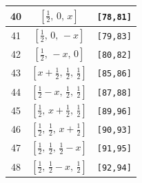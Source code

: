 \documentclass[fleqn,8pt]{jsarticle}
\begin{document}
\begin{longtable}{ccc}
40 & $\left[ \frac{1}{2},\, 0,\, x \right]$ & {\tt [78,81]} \\ \hline
41 & $\left[ \frac{1}{2},\, 0,\, - x \right]$ & {\tt [79,83]} \\ \hline
42 & $\left[ \frac{1}{2},\, - x,\, 0 \right]$ & {\tt [80,82]} \\ \hline
43 & $\left[ x + \frac{1}{2},\, \frac{1}{2},\, \frac{1}{2} \right]$ & {\tt [85,86]} \\ \hline
44 & $\left[ \frac{1}{2} - x,\, \frac{1}{2},\, \frac{1}{2} \right]$ & {\tt [87,88]} \\ \hline
45 & $\left[ \frac{1}{2},\, x + \frac{1}{2},\, \frac{1}{2} \right]$ & {\tt [89,96]} \\ \hline
46 & $\left[ \frac{1}{2},\, \frac{1}{2},\, x + \frac{1}{2} \right]$ & {\tt [90,93]} \\ \hline
47 & $\left[ \frac{1}{2},\, \frac{1}{2},\, \frac{1}{2} - x \right]$ & {\tt [91,95]} \\ \hline
48 & $\left[ \frac{1}{2},\, \frac{1}{2} - x,\, \frac{1}{2} \right]$ & {\tt [92,94]} \\
\end{longtable}
\renewcommand{\arraystretch}{1.2}
\end{document}
